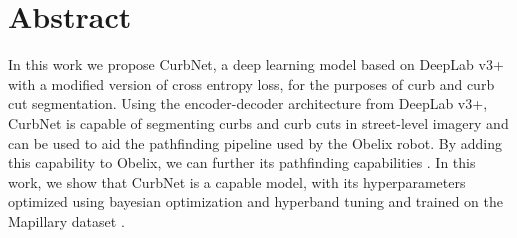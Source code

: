 \chapter*{Abstract}
In this work we propose CurbNet, a deep learning model based on DeepLab v3+ \cite{deeplab} with a modified version of cross entropy loss, for the purposes of curb and curb cut segmentation.
Using the encoder-decoder architecture from DeepLab v3+, CurbNet is capable of segmenting curbs and curb cuts in street-level imagery and can be used to aid the pathfinding pipeline used by the Obelix robot.
By adding this capability to Obelix, we can further its pathfinding capabilities \cite{europa}.
In this work, we show that CurbNet is a capable model, with its hyperparameters optimized using bayesian optimization and hyperband tuning \cite{bohb} and trained on the Mapillary dataset \cite{mapillary}.